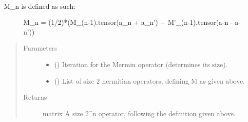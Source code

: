 \documentclass[letterpaper,10pt,english]{sphinxmanual}
\begin{document}
\begin{fulllineitems}
\label{\detokenize{mermin_eval:mermin_eval.M_all}}~\begin{description}
\item[{M\_n is defined as such:}] \leavevmode
M\_n = (1/2)*(M\_(n-1).tensor(a\_n + a\_n’) + M’\_(n-1).tensor(a-n - a-n’))

\end{description}
\begin{quote}\begin{description}
\item[{Parameters}] \leavevmode\begin{itemize}
\item {} 
 () \textendash{} Iteration for the Mermin operator (determines its size).

\item {} 
\sphinxstyleliteralstrong{\sphinxupquote{,}} (\sphinxstyleliteralemphasis{\sphinxupquote{{[}}}\sphinxstyleliteralemphasis{\sphinxupquote{{]}}}) \textendash{} List of size 2 hermitian operators, defining M
as given above.

\end{itemize}

\item[{Returns}] \leavevmode
matrix \textendash{} A size 2\textasciicircum{}n operator, following the definition given 
above.

\end{description}\end{quote}

\end{fulllineitems}

\end{document}

